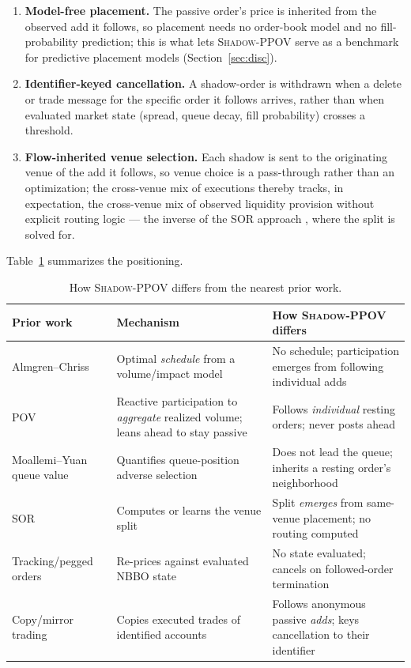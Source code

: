 \documentclass[11pt]{article}
\newcommand{\pov}{\textsc{Shadow-PPOV}}
\begin{document}
\begin{enumerate}[leftmargin=1.6em]
  \item \textbf{Model-free placement.} The passive order's price is inherited
  from the observed add it follows, so placement needs no order-book model and no
  fill-probability prediction; this is what lets \pov{} serve as a benchmark for
  predictive placement models (Section~\ref{sec:disc}).
  \item \textbf{Identifier-keyed cancellation.} A shadow-order is withdrawn when a
  delete or trade message for the specific order it follows arrives, rather
  than when evaluated market state (spread, queue decay, fill probability)
  crosses a threshold.
  \item \textbf{Flow-inherited venue selection.} Each shadow is sent to the
  originating venue of the add it follows, so venue choice is a pass-through
  rather than an optimization; the cross-venue mix of executions thereby tracks,
  in expectation, the cross-venue mix of observed liquidity provision without
  explicit routing logic --- the inverse of the SOR approach
  \cite{foucault2008,laruelle2011}, where the split is solved for.
\end{enumerate}

Table~\ref{tab:novelty} summarizes the positioning.

\begin{table}[h]
\centering
\caption{How \pov{} differs from the nearest prior work.}
\label{tab:novelty}
\small
\begin{tabular}{p{5.0cm}p{4.3cm}p{5.4cm}}
\toprule
Prior work & Mechanism & How \pov{} differs \\
\midrule
Almgren--Chriss \cite{almgren2000} &
Optimal \emph{schedule} from a volume/impact model &
No schedule; participation emerges from following individual adds \\
\addlinespace
POV \cite{kissell} &
Reactive participation to \emph{aggregate} realized volume; leans ahead to
stay passive &
Follows \emph{individual} resting orders; never posts ahead \\
\addlinespace
Moallemi--Yuan queue value \cite{moallemi2016} &
Quantifies queue-position adverse selection &
Does not lead the queue; inherits a resting order's neighborhood \\
\addlinespace
SOR \cite{foucault2008,laruelle2011} &
Computes or learns the venue split &
Split \emph{emerges} from same-venue placement; no routing computed \\
\addlinespace
Tracking/pegged orders \cite{us10614520} &
Re-prices against evaluated NBBO state &
No state evaluated; cancels on followed-order termination \\
\addlinespace
Copy/mirror trading \cite{us20130268423} &
Copies executed trades of identified accounts &
Follows anonymous passive \emph{adds}; keys cancellation to their identifier \\
\bottomrule
\end{tabular}
\end{table}
\end{document}
